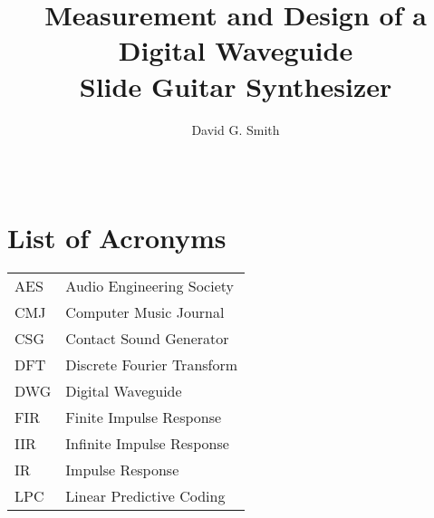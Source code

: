 \documentclass [11pt, letterpaper]{report}
\begin{document}

\title{Measurement and Design of a Digital Waveguide\\ Slide Guitar Synthesizer}
\author{David G. Smith}
\date{\Month\ \number\year}

\maketitle

\raggedbottom
\onehalfspacing
{}

\tableofcontents

\newpage{}

\chapter*{List of Acronyms}

\begin{longtable}{ll}
    AES & Audio Engineering Society\\
    CMJ & Computer Music Journal\\
    CSG & Contact Sound Generator\\
    DFT & Discrete Fourier Transform\\
    DWG & Digital Waveguide\\
    FIR & Finite Impulse Response\\
    IIR & Infinite Impulse Response\\
    IR & Impulse Response\\
    LPC & Linear Predictive Coding\\
\end{longtable}

\cleardoublepage
\end{document}
